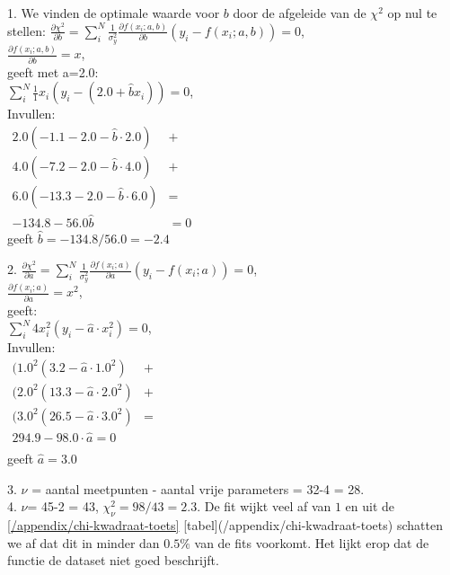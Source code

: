 1. We vinden de optimale waarde voor $b$ door de afgeleide van de $\chi^2$ op nul te stellen: ${\frac{\partial \chi^2}{\partial b} = \sum_i^N \frac{1}{\sigma_y^2} \frac{\partial f(x_i;a,b)}{\partial b} \left(y_i - f(x_i;a,b)\right) = 0 }$,\\
$\frac{\partial f(x_i;a,b)}{\partial b} = x$, \\
geeft met a=2.0: \\
${\sum_i^N \frac{1}{1} x_i(y_i - (2.0 + \hat{b} x_i )) = 0}$, \\
Invullen: \\
$\begin{aligned}
2.0 \left( -1.1 -  2.0 - \hat{b} \cdot 2.0\right) & +  \\
4.0 \left( -7.2 - 2.0 - \hat{b} \cdot 4.0 \right) & + \\
6.0 \left( -13.3 - 2.0 - \hat{b} \cdot 6.0 \right) & = \\
- 134.8 - 56.0 \hat{b} & = 0
\end{aligned}$\\
geeft $ \hat{b} = - 134.8/56.0  = - 2.4 $


2. ${\frac{\partial \chi^2}{\partial a} = \sum_i^N \frac{1}{\sigma_y^2} \frac{\partial f(x_i;a)}{\partial a} \left(y_i - f(x_i;a)\right) = 0 }$,\\
$\frac{\partial f(x_i;a)}{\partial a} = x^2$,\\
geeft:\\
${\sum_i^N {4} x^2_i \left( y_i - \hat{a} \cdot x_i^2 \right) = 0}$,\\
Invullen:\\
$\begin{aligned}
(1.0^2 \left( 3.2 - \hat{a} \cdot 1.0^2 \right) & +  \\
(2.0^2 \left( 13.3 - \hat{a} \cdot 2.0^2 \right) & + \\
(3.0^2 \left( 26.5 - \hat{a} \cdot 3.0^2 \right) & = \\
294.9 - 98.0 \cdot \hat{a} = 0 \\
\end{aligned}$\\
geeft $\hat{a} = 3.0$


3. $\nu$ = aantal meetpunten - aantal vrije parameters = 32-4 = 28.\\


4. $\nu$= 45-2 = 43, $\chi^2_\nu = 98/43 =2.3$. De fit wijkt veel af van $1$ en uit de \ref{/appendix/chi-kwadraat-toets} [tabel](/appendix/chi-kwadraat-toets) schatten we af dat dit in minder dan $0.5\%$ van de fits voorkomt. Het lijkt erop dat de functie de dataset niet goed beschrijft.\\


